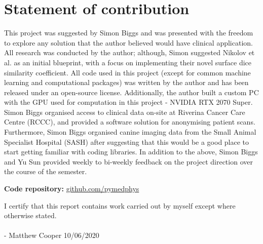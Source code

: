 \chapter{Statement of contribution}
\label{ch:contribution}

This project was suggested by Simon Biggs and was presented with the freedom to explore any solution that the author believed would have clinical application. All research was conducted by the author; although, Simon suggested Nikolov et al. as an initial blueprint, with a focus on implementing their novel surface dice similarity coefficient. All code used in this project (except for common machine learning and computational packages) was written by the author and has been released under an open-source license. Additionally, the author built a custom PC with the GPU used for computation in this project - NVIDIA RTX 2070 Super. Simon Biggs organised access to clinical data on-site at Riverina Cancer Care Centre (RCCC), and provided a software solution for anonymising patient scans. Furthermore, Simon Biggs organised canine imaging data from the Small Animal Specialist Hospital (SASH) after suggesting that this would be a good place to start getting familiar with coding libraries. In addition to the above, Simon Biggs and Yu Sun provided weekly to bi-weekly feedback on the project direction over the course of the semester.


\textbf{Code repository:} \href{https://github.com/pymedphys/pymedphys}{github.com/pymedphys}


\vspace{1cm}
\vspace{1cm}

I certify that this report contains work carried out by myself except where otherwise
stated.
\\
\\
- Matthew Cooper     10/06/2020
\\
\\
